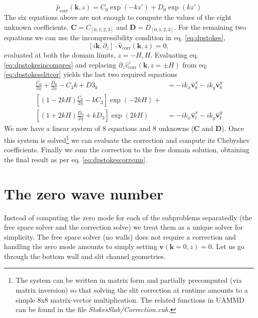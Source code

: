\documentclass[ twoside,openright,titlepage,numbers=noenddot,%
headinclude,footinclude,cleardoublepage=empty,abstract=on,
BCOR=5mm,paper=a4,fontsize=11pt, dvipsnames
]{scrreprt}
\renewcommand{\vec}[1]{\bm{#1}}
\newcommand{\uammd}{\gls{UAMMD}\xspace}
\newcommand{\fou}[1]{\widehat{#1}}
\newcommand{\fvel}{v}
\newcommand{\corr}{\text{corr}}
\begin{document}
\begin{equation}
  \fou{p}_{\corr}(\vec{k}, z) = C_0\exp(-k z') + D_0\exp(k z')
\end{equation}
The six equations above are not enough to compute the values of the eight unknown coefficients, $\vec{C}=C_{[0,1,2,3]}$ and $\vec{D} = D_{[0,1,2,3]}$. For the remaining two equations we can use the incompressibility condition in eq. \eqref{eq:dpstokes},
\begin{equation}
  \label{eq:dpstokesincompres}
  [i\vec{k}, \partial_z] \cdot\fou{\vec{\fvel}}_{\corr}(\vec{k}, z) = 0,
\end{equation}
evaluated at both the domain limits, $z=-H,H$.
Evaluating eq. \eqref{eq:dpstokesincompres} and replacing $\partial_z\fou{\fvel}_{\corr}^z(\vec{k}, z=\pm H)$ from eq. \eqref{eq:dpstokesslitcor} yields the last two required equations
\begin{equation}
  \begin{aligned}
    \frac{C_0}{2\eta} + \frac{D_0}{2\eta} - C_3k + D3_k &= -ik_x\fou{\vec{\fvel}}_b^x - ik_y\fou{\vec{\fvel}}_b^y\\
    \left[(1-2kH)\frac{C_0}{2\eta}-kC_3\right]\exp(-2kH) +&\\ \left[(1+2kH)\frac{D_0}{2\eta} + kD_3\right]\exp(2kH) &= -ik_x\fou{\vec{\fvel}}_t^x - ik_y\fou{\vec{\fvel}}_t^y
\end{aligned}
\end{equation}
We now have a linear system of 8 equations and 8 unknowns ($\vec{C}$ and $\vec{D}$). Once this system is solved\footnote{The system can be written in matrix form and partially precomputed (via matrix inversion) so that solving the slit correction at runtime amounts to a simple 8x8 matrix-vector multiplication. The related functions in \uammd can be found in the file \emph{StokesSlab/Correction.cuh}.} we can evaluate the correction and compute its Chebyshev coefficients. Finally we sum the correction to the free domain solution, obtaining the final result as per eq. \eqref{eq:dpstokescorrsum}.

\section{The zero wave number}
Instead of computing the zero mode for each of the subproblems separatedly (the free space solver and the correction solve) we treat them as a unique solver for simplicity. The free space solver (no walls) does not require a correction and handling the zero mode amounts to simply setting $\vec{\fvel}(\vec{k}=0,z) = 0$. Let us go through the bottom wall and slit channel geometries.
\end{document}
